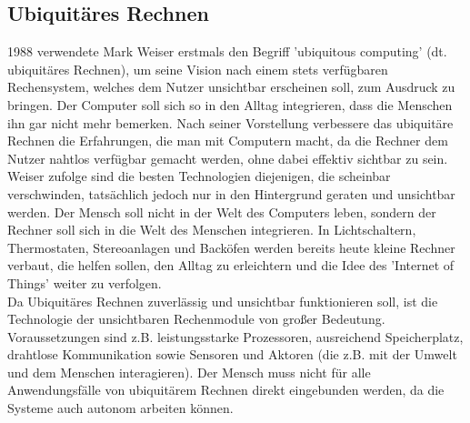 \subsection{Ubiquit\"ares Rechnen}\label{ss:UbiquitaeresRechnen}

1988 verwendete Mark Weiser erstmals den Begriff 'ubiquitous computing' (dt. ubiquitäres Rechnen), um seine Vision nach einem stets verfügbaren Rechensystem, welches dem Nutzer unsichtbar erscheinen soll, zum Ausdruck zu bringen. Der Computer soll sich so in den Alltag integrieren, dass die Menschen ihn gar nicht mehr bemerken. Nach seiner Vorstellung verbessere das ubiquitäre Rechnen die Erfahrungen, die man mit Computern macht, da die Rechner dem Nutzer nahtlos verfügbar gemacht werden, ohne dabei effektiv sichtbar zu sein.\\

Weiser zufolge sind die besten Technologien diejenigen, die scheinbar verschwinden, tatsächlich jedoch nur in den Hintergrund geraten und unsichtbar werden. Der Mensch soll nicht in der Welt des Computers leben, sondern der Rechner soll sich in die Welt des Menschen integrieren. In Lichtschaltern, Thermostaten, Stereoanlagen und Backöfen werden bereits heute kleine Rechner verbaut, die helfen sollen, den Alltag zu erleichtern und die Idee des 'Internet of Things' weiter zu verfolgen.\\

Da Ubiquitäres Rechnen zuverlässig und unsichtbar funktionieren soll, ist die Technologie der unsichtbaren Rechenmodule von großer Bedeutung. Voraussetzungen sind z.B. leistungsstarke Prozessoren, ausreichend Speicherplatz, drahtlose Kommunikation sowie Sensoren und Aktoren (die z.B. mit der Umwelt und dem Menschen interagieren). Der Mensch muss nicht für alle Anwendungsfälle von ubiquitärem Rechnen direkt eingebunden werden, da die Systeme auch autonom arbeiten können\cite{d:wolf}.\\